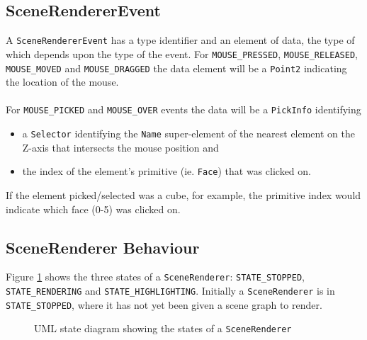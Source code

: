 \documentclass[10pt,aps, prb,preprint]{article}
\begin{document}
\subsection{SceneRendererEvent}
\label{SceneRendererEvent}
A \texttt{SceneRendererEvent} has a type identifier and an element of data, the type of which depends upon the type of the event. For \texttt{MOUSE\_PRESSED}, \texttt{MOUSE\_RELEASED}, \texttt{MOUSE\_MOVED} and \texttt{MOUSE\_DRAGGED} the data element will be a \texttt{Point2} indicating the location of the mouse. 
\\
\\
For \texttt{MOUSE\_PICKED} and \texttt{MOUSE\_OVER} events the data will be a \texttt{PickInfo} identifying 
\begin{itemize}
\item a \texttt{Selector} identifying the \texttt{Name} super-element of the nearest element on the Z-axis that intersects the mouse position and
\item the index of the element's primitive (ie. \texttt{Face}) that was clicked on.
\end{itemize}
If the element picked/selected was a cube, for example, the primitive index would indicate which face (0-5) was clicked on. 

\subsection{SceneRenderer Behaviour}
\label{SceneRendererBehaviour}
Figure \ref{fig:rendererStates} shows the three states of a \texttt{SceneRenderer}: \texttt{STATE\_STOPPED}, \texttt{STATE\_RENDERING} and \texttt{STATE\_HIGHLIGHTING}. Initially a \texttt{SceneRenderer} is in \texttt{STATE\_STOPPED}, where it has not yet been given a scene graph to render. 

\begin{figure}[!h]
\label{fig:rendererStates}
\begin{center}
\caption{UML state diagram showing the states of a \texttt{SceneRenderer}}
\end{center}
\end{figure}
\end{document}
